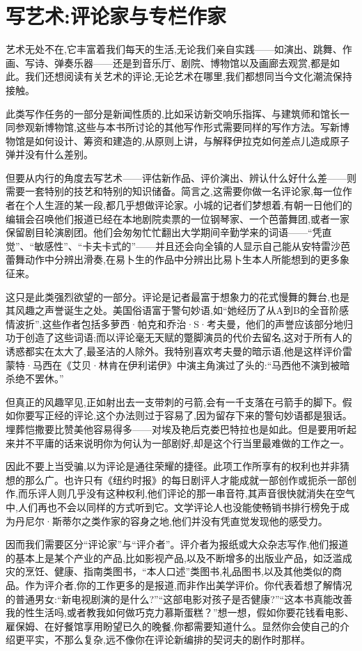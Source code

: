 \chapter{写艺术:评论家与专栏作家}
艺术无处不在,它丰富着我们每天的生活,无论我们亲自实践——如演出、跳舞、作画、写诗、弹奏乐器——还是到音乐厅、剧院、博物馆以及画廊去观赏,都是如此。我们还想阅读有关艺术的评论,无论艺术在哪里,我们都想同当今文化潮流保持接触。

此类写作任务的一部分是新闻性质的,比如采访新交响乐指挥、与建筑师和馆长一同参观新博物馆,这些与本书所讨论的其他写作形式需要同样的写作方法。写新博物馆是如何设计、筹资和建造的,从原则上讲，与解释伊拉克如何差点儿造成原子弹并没有什么差别。

但要从内行的角度去写艺术——评估新作品、评价演出、辨认什么好什么差——则需要一套特别的技艺和特别的知识储备。简言之,这需要你做一名评论家,每一位作者在个人生涯的某一段,都几乎想做评论家。小城的记者们梦想着,有朝一日他们的编辑会召唤他们报道已经在本地剧院卖票的一位钢琴家、一个芭蕾舞团,或者一家保留剧目轮演剧团。他们会匆匆忙忙翻出大学期间辛勤学来的词语——“凭直觉”、“敏感性”、“卡夫卡式的”——并且还会向全镇的人显示自己能从安特雷沙芭蕾舞动作中分辨出滑奏,在易卜生的作品中分辨出比易卜生本人所能想到的更多象征来。

这只是此类强烈欲望的一部分。评论是记者最富于想象力的花式慢舞的舞台,也是其风趣之声誉诞生之处。美国俗语富于警句妙语,如“她经历了从A到B的全音阶感情波折”,这些作者包括多萝西·帕克和乔治·S·考夫曼，他们的声誉应该部分地归功于创造了这些词语;而以评论毫无天赋的蹩脚演员的代价去留名,这对于所有人的诱惑都实在太大了,最圣洁的人除外。我特别喜欢考夫曼的暗示语,他是这样评价雷蒙特·马西在《艾贝·林肯在伊利诺伊》中演主角演过了头的:“马西他不演到被暗杀绝不罢休。”

但真正的风趣罕见,正如射出去一支带刺的弓箭,会有一千支落在弓箭手的脚下。假如你要写正经的评论,这个办法则过于容易了,因为留存下来的警句妙语都是狠话。埋葬恺撒要比赞美他容易得多——对埃及艳后克娄巴特拉也是如此。但是要用听起来并不平庸的话来说明你为何认为一部剧好,却是这个行当里最难做的工作之一。

因此不要上当受骗,以为评论是通往荣耀的捷径。此项工作所享有的权利也并非猜想的那么广。也许只有《纽约时报》的每日剧评人才能成就一部创作或扼杀一部创作,而乐评人则几乎没有这种权利,他们评论的那一串音符,其声音很快就消失在空气中,人们再也不会以同样的方式听到它。文学评论人也没能使畅销书排行榜免于成为丹尼尔·斯蒂尔之类作家的容身之地,他们并没有凭直觉发现他的感受力。

因而我们需要区分“评论家”与“评介者”。评介者为报纸或大众杂志写作,他们报道的基本上是某个产业的产品,比如影视产品,以及不断增多的出版业产品，如泛滥成灾的烹饪、健康、指南类图书，“本人口述”类图书,礼品图书,以及其他类似的商品。作为评介者,你的工作更多的是报道,而非作出美学评价。你代表着想了解情况的普通男女:“新电视剧演的是什么?”“这部电影对孩子是否健康?”“这本书真能改善我的性生活吗,或者教我如何做巧克力慕斯蛋糕？”想一想，假如你要花钱看电影、雇保姆、在好餐馆享用盼望已久的晚餐,你都需要知道什么。显然你会使自己的介绍更平实，不那么复杂,远不像你在评论新编排的契诃夫的剧作时那样。


